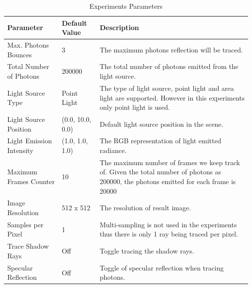 \begin{table}[Ht]
\begin{center}
	
	\renewcommand{\arraystretch}{1.2}
	\begin{tabular}{p{5cm}p{3cm}p{5cm}}
	
	Parameter  				& 		Default Value 		&		Description \\ 
	
	\hline 

	Max. Photons Bounces		& 		3					&		The maximum photons reflection will be traced. \\  

	\hline 					

	Total Number of Photons 	& 		200000				&		The total number of photons emitted from the light 																	source. \\

	\hline

	Light Source Type			& 		Point Light			& 		The type of light source, point light and area light
																are supported. However in this experiments only point 																	light is used. \\ 
	
	\hline
	
	Light Source Position 		& 	 	(0.0, 10.0, 0.0)		&		Default light source position in the scene. \\  


	\hline 
	
	Light Emission Intensity	&		(1.0, 1.0, 1.0)		&		The RGB representation of light emitted radiance.\\  

	\hline 

	Maximum Frames Counter 	& 		10 					& 		The maximum number of frames we keep track of. Given 																	the total number of photons as 200000, the photons 																	emitted for each frame is 20000\\

	\hline
	
	Image Resolution 			&		512 x 512				&		The resolution of result image. \\

	\hline 
	
	Samples per Pixel			& 		1 					& 		Multi-sampling is not used in the experiments thus 																	there is only 1 ray being traced per pixel.\\
	
	\hline 
	
	Trace Shadow Rays			&		Off					& 		Toggle tracing the shadow rays. \\

	\hline

	Specular Reflection		&		Off					&		Toggle of specular reflection when tracing photons. \\

	\hline
	
	\end{tabular}
\end{center} 
\caption{Experiments Parameters}
\label{tab:expr_params}
\end{table}

